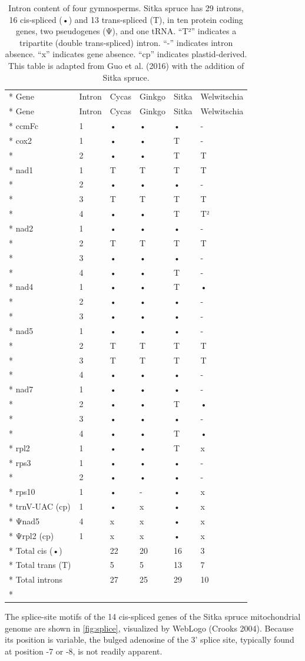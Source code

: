 \documentclass[
  12pt,
  oneside,
  openany]{book}
\begin{document}
\hypertarget{tbl:introns}{}
\begin{singlespace}
\small
\begin{longtable}[]{@{}llllll@{}}
\caption[Intron content of four gymnosperms.]{\label{tbl:introns}\footnotesize Intron content of four gymnosperms. Sitka spruce has 29 introns, 16 cis-spliced (•) and 13 trans-spliced (T), in ten protein coding genes, two pseudogenes (Ψ), and one tRNA. ``T²'' indicates a tripartite (double trans-spliced) intron. ``-'' indicates intron absence. ``x'' indicates gene absence. ``cp'' indicates plastid-derived. This table is adapted from Guo et al. (2016) with the addition of Sitka spruce.}\tabularnewline*
\toprule
Gene & Intron & Cycas & Ginkgo & Sitka & Welwitschia\tabularnewline*
\midrule
\endfirsthead
\toprule
Gene & Intron & Cycas & Ginkgo & Sitka & Welwitschia\tabularnewline*
\midrule
\endhead
ccmFc & 1 & • & • & • & -\tabularnewline*
cox2 & 1 & • & • & T & -\tabularnewline*
& 2 & • & • & T & T\tabularnewline*
nad1 & 1 & T & T & T & T\tabularnewline*
& 2 & • & • & • & -\tabularnewline*
& 3 & T & T & T & T\tabularnewline*
& 4 & • & • & T & T²\tabularnewline*
nad2 & 1 & • & • & • & -\tabularnewline*
& 2 & T & T & T & T\tabularnewline*
& 3 & • & • & • & -\tabularnewline*
& 4 & • & • & T & -\tabularnewline*
nad4 & 1 & • & • & T & •\tabularnewline*
& 2 & • & • & • & -\tabularnewline*
& 3 & • & • & • & -\tabularnewline*
nad5 & 1 & • & • & • & -\tabularnewline*
& 2 & T & T & T & T\tabularnewline*
& 3 & T & T & T & T\tabularnewline*
& 4 & • & • & • & -\tabularnewline*
nad7 & 1 & • & • & • & -\tabularnewline*
& 2 & • & • & T & •\tabularnewline*
& 3 & • & • & • & -\tabularnewline*
& 4 & • & • & T & •\tabularnewline*
rpl2 & 1 & • & • & T & x\tabularnewline*
rps3 & 1 & • & • & • & -\tabularnewline*
& 2 & • & • & • & -\tabularnewline*
rps10 & 1 & • & - & • & x\tabularnewline*
trnV-UAC (cp) & 1 & • & x & • & x\tabularnewline*
Ψnad5 & 4 & x & x & • & x\tabularnewline*
Ψrpl2 (cp) & 1 & x & x & • & x\tabularnewline*
Total cis (•) & & 22 & 20 & 16 & 3\tabularnewline*
Total trans (T) & & 5 & 5 & 13 & 7\tabularnewline*
Total introns & & 27 & 25 & 29 & 10\tabularnewline*
\bottomrule
\end{longtable}
\end{singlespace}

The splice-site motifs of the 14 cis-spliced genes of the Sitka spruce mitochondrial genome are shown in \cref{fig:splice}, visualized by WebLogo (Crooks 2004). Because its position is variable, the bulged adenosine of the 3' splice site, typically found at position -7 or -8, is not readily apparent.
\end{document}

